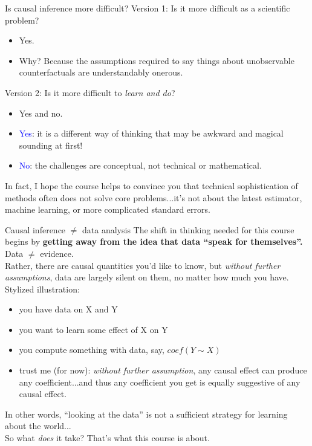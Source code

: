 \documentclass[xcolor=dvipsnames]{beamer}
\begin{document}
\begin{frame}{Is causal inference more difficult?}
 Version 1: Is it more difficult as a scientific problem?\\
\small
\begin{itemize}
\item Yes.
\item Why? Because the assumptions required to say things about unobservable counterfactuals are understandably onerous.
\end{itemize}
\medskip
\normalsize
{} Version 2: Is it more difficult to \textit{learn and do}?\\
\small
\begin{itemize}
\item Yes and no.
\item \textcolor{blue}{Yes}: it is a different way of thinking that may be awkward and magical sounding at first!
\item \textcolor{blue}{No}: the challenges are conceptual, not technical or mathematical.
\end{itemize}
\small
{} In fact, I hope the course helps to convince you that technical sophistication of methods often does not solve core problems...it's not about the latest estimator, machine learning, or more complicated standard errors.
\end{frame}


\begin{frame}{Causal inference $\neq$ data analysis}
\small
{} The shift in thinking needed for this course begins by \textbf{getting away from the idea that data ``speak for themselves''.} Data $\neq$ evidence. \\
\medskip
{} Rather, there are causal quantities you'd like to know, but \textit{without further assumptions}, data are largely silent on them, no matter how much you have. \\
\medskip
{}
Stylized illustration:
\begin{itemize}
\item you have data on X and Y
\item you want to learn some effect of X on Y
\item you compute something with data, say, $coef(Y\sim X)$
\item trust me (for now): \textit{without further assumption}, any causal effect can produce any coefficient...and thus any coefficient you get is equally suggestive of any causal effect.
\end{itemize}
 In other words, ``looking at the data'' is not a sufficient strategy for learning about the world... \\
\bigskip
{} So what \textit{does} it take? That's what this course is about.
\end{frame}
\end{document}
